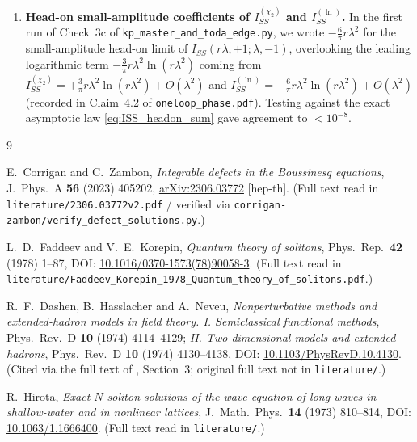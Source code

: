 \documentclass[11pt,a4paper]{article}
\begin{document}
\begin{enumerate}
50-digit quadrature).
\item \textbf{Head-on small-amplitude coefficients of $I_{SS}^{(\chi_2)}$ and $I_{SS}^{(\ln)}$.}
In the first run of Check~3c of \texttt{kp\_master\_and\_toda\_edge.py}, we wrote
$-\frac{6}{\pi}r\lambda^2$ for the small-amplitude head-on limit of
$I_{SS}(r\lambda,+1;\lambda,-1)$, overlooking the leading logarithmic term
$-\frac{3}{\pi}r\lambda^2\ln(r\lambda^2)$ coming from
$I_{SS}^{(\chi_2)} = +\frac{3}{\pi}r\lambda^2\ln(r\lambda^2) + O(\lambda^2)$ and
$I_{SS}^{(\ln)} = -\frac{6}{\pi}r\lambda^2\ln(r\lambda^2) + O(\lambda^2)$
(recorded in Claim~4.2 of \texttt{oneloop\_phase.pdf}). Testing against the exact
asymptotic law \eqref{eq:ISS_headon_sum} gave agreement to $< 10^{-8}$.
\end{enumerate}

\begin{thebibliography}{9}

E.~Corrigan and C.~Zambon,
\emph{Integrable defects in the Boussinesq equations},
J.~Phys.~A \textbf{56} (2023) 405202,
\href{https://arxiv.org/abs/2306.03772}{arXiv:2306.03772} [hep-th].
(Full text read in \texttt{literature/2306.03772v2.pdf} / verified via
\texttt{corrigan-zambon/verify\_defect\_solutions.py}.)

L.~D.~Faddeev and V.~E.~Korepin,
\emph{Quantum theory of solitons},
Phys.~Rep.\ \textbf{42} (1978) 1--87,
DOI: \href{https://doi.org/10.1016/0370-1573(78)90058-3}{10.1016/0370-1573(78)90058-3}.
(Full text read in \texttt{literature/Faddeev\_Korepin\_1978\_Quantum\_theory\_of\_solitons.pdf}.)

R.~F.~Dashen, B.~Hasslacher and A.~Neveu,
\emph{Nonperturbative methods and extended-hadron models in field theory. I. Semiclassical functional methods},
Phys.~Rev.~D \textbf{10} (1974) 4114--4129;
\emph{II. Two-dimensional models and extended hadrons},
Phys.~Rev.~D \textbf{10} (1974) 4130--4138,
DOI: \href{https://doi.org/10.1103/PhysRevD.10.4130}{10.1103/PhysRevD.10.4130}.
(Cited via the full text of \cite{FK1978}, Section~3; original full text not in \texttt{literature/}.)

R.~Hirota,
\emph{Exact $N$-soliton solutions of the wave equation of long waves in shallow-water and in nonlinear lattices},
J.~Math.~Phys.\ \textbf{14} (1973) 810--814,
DOI: \href{https://doi.org/10.1063/1.1666400}{10.1063/1.1666400}.
(Full text read in \texttt{literature/}.)

\end{thebibliography}
\end{document}
